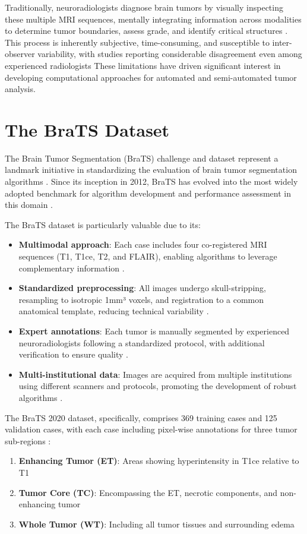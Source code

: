 Traditionally, neuroradiologists diagnose brain tumors by visually inspecting these multiple MRI sequences, mentally integrating information across modalities to determine tumor boundaries, assess grade, and identify critical structures \cite{DeAngelis2001}. This process is inherently subjective, time-consuming, and susceptible to inter-observer variability, with studies reporting considerable disagreement even among experienced radiologists  These limitations have driven significant interest in developing computational approaches for automated and semi-automated tumor analysis.

\section{The BraTS Dataset}

The Brain Tumor Segmentation (BraTS) challenge and dataset represent a landmark initiative in standardizing the evaluation of brain tumor segmentation algorithms \cite{Menze2015, Bakas2018}. Since its inception in 2012, BraTS has evolved into the most widely adopted benchmark for algorithm development and performance assessment in this domain \cite{Bakas2019}.

The BraTS dataset is particularly valuable due to its:

\begin{itemize}
  \item \textbf{Multimodal approach}: Each case includes four co-registered MRI sequences (T1, T1ce, T2, and FLAIR), enabling algorithms to leverage complementary information \cite{Bakas2017}.
  \item \textbf{Standardized preprocessing}: All images undergo skull-stripping, resampling to isotropic 1mm³ voxels, and registration to a common anatomical template, reducing technical variability \cite{Bakas2018}.
  \item \textbf{Expert annotations}: Each tumor is manually segmented by experienced neuroradiologists following a standardized protocol, with additional verification to ensure quality \cite{Menze2015}.
  \item \textbf{Multi-institutional data}: Images are acquired from multiple institutions using different scanners and protocols, promoting the development of robust algorithms \cite{Bakas2019}.
\end{itemize}

The BraTS 2020 dataset, specifically, comprises 369 training cases and 125 validation cases, with each case including pixel-wise annotations for three tumor sub-regions \cite{Bakas2020}:
\begin{enumerate}
  \item \textbf{Enhancing Tumor (ET)}: Areas showing hyperintensity in T1ce relative to T1
  \item \textbf{Tumor Core (TC)}: Encompassing the ET, necrotic components, and non-enhancing tumor
  \item \textbf{Whole Tumor (WT)}: Including all tumor tissues and surrounding edema
\end{enumerate}


